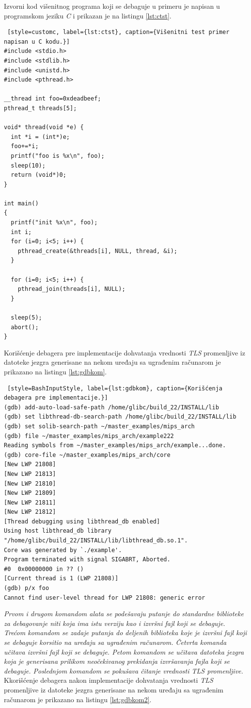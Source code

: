 \documentclass[12pt,oneside]{memoir}
\begin{document}
Izvorni kod višenitnog programa koji se debaguje u primeru je napisan u programskom jeziku \emph{C} i prikazan je na listingu \ref{lst:ctst}.

\begin{lstlisting} [style=customc, label={lst:ctst}, caption={Višenitni test primer napisan u C kodu.}]
#include <stdio.h>
#include <stdlib.h>
#include <unistd.h>
#include <pthread.h>

__thread int foo=0xdeadbeef;
pthread_t threads[5];

void* thread(void *e) {
  int *i = (int*)e;
  foo+=*i;
  printf("foo is %x\n", foo);
  sleep(10);
  return (void*)0;
}   

int main()
{
  printf("init %x\n", foo);
  int i;
  for (i=0; i<5; i++) {
    pthread_create(&threads[i], NULL, thread, &i);
  }

  for (i=0; i<5; i++) {
    pthread_join(threads[i], NULL);
  }

  sleep(5);
  abort();
}

\end{lstlisting}

Korišćenje debagera pre implementacije dohvatanja vrednosti \emph{TLS} promenljive iz datoteke jezgra generisane na nekom uređaju sa ugrađenim računarom je prikazano na listingu \ref{lst:gdbkom}.

\begin{lstlisting} [style=BashInputStyle, label={lst:gdbkom}, caption={Korišćenja debagera pre implementacije.}]
(gdb) add-auto-load-safe-path /home/glibc/build_22/INSTALL/lib
(gdb) set libthread-db-search-path /home/glibc/build_22/INSTALL/lib
(gdb) set solib-search-path ~/master_examples/mips_arch
(gdb) file ~/master_examples/mips_arch/example222 
Reading symbols from ~/master_examples/mips_arch/example...done.
(gdb) core-file ~/master_examples/mips_arch/core
[New LWP 21808]
[New LWP 21813]
[New LWP 21810]
[New LWP 21809]
[New LWP 21811]
[New LWP 21812]
[Thread debugging using libthread_db enabled]
Using host libthread_db library "/home/glibc/build_22/INSTALL/lib/libthread_db.so.1".
Core was generated by `./example'.
Program terminated with signal SIGABRT, Aborted.
#0  0x00000000 in ?? ()
[Current thread is 1 (LWP 21808)]
(gdb) p/x foo
Cannot find user-level thread for LWP 21808: generic error
\end{lstlisting}

\emph{Prvom i drugom komandom alata se podešavaju putanje do standardne biblioteke za debagovanje niti koja ima istu verziju kao i izvršni fajl koji se debaguje. Trećom komandom se zadaje putanja do deljenih biblioteka koje je izvršni fajl koji se debaguje korsitio na uređaju sa ugrađenim računarom. Četvrta komanda učitava izvršni fajl koji se debaguje. Petom komandom se učitava datoteka jezgra koja je generisana prilikom neočekivanog prekidanja izvršavanja fajla koji se debaguje. Poslednjom komandom se pokušava čitanje vrednosti \emph{TLS} promenljive.}
Kkorišćenje debagera nakon implementacije dohvatanja vrednosti \emph{TLS} promenljive iz datoteke jezgra generisane na nekom uređaju sa ugrađenim računarom je prikazano na listingu \ref{lst:gdbkom2}.
\end{document}
